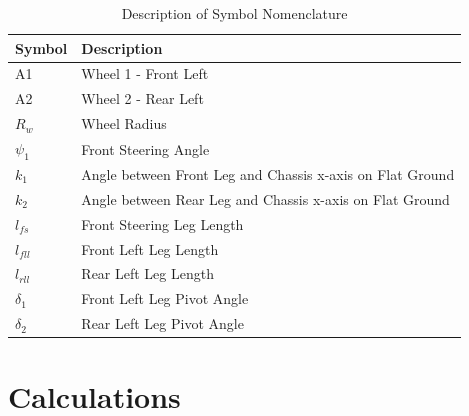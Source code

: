 \begin{table}[H]
\begin{center}\label{table:2}
	\begin{tabular}{| >{\centering\arraybackslash} m{1.2in} | >{\centering\arraybackslash} m{4.5in} |} 
		\hline
		Symbol & Description \\
		\hline
		A1 & Wheel 1 - Front Left \\
		A2 & Wheel 2 - Rear Left \\
		$R_{w}$ & Wheel Radius \\
		$\psi_{1}$ & Front Steering Angle \\
		$k_{1}$ & Angle between Front Leg and Chassis x-axis on Flat Ground \\
		$k_{2}$ & Angle between Rear Leg and Chassis x-axis on Flat Ground \\
		$l_{fs}$ & Front Steering Leg Length \\ 
		$l_{fll}$ & Front Left Leg Length \\ 
		$l_{rll}$ & Rear Left Leg Length \\ 
		$\delta_{1}$ & Front Left Leg Pivot Angle    \\
		$\delta_{2}$ & Rear Left Leg Pivot Angle   \\
		\hline
	
	\end{tabular}
\caption{Description of Symbol Nomenclature}
\end{center}
\end{table}


\section{Calculations}
